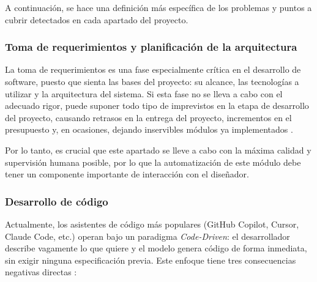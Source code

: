 \documentclass[11pt, letterpaper]{article}
\begin{document}
A continuación, se hace una definición más específica de los problemas y puntos a cubrir detectados en cada apartado del proyecto.
\newpage 

\subsubsection{Toma de requerimientos y planificación de la arquitectura}
\label{sec:ProblemaTomaRequerimientos}

La toma de requerimientos es una fase especialmente crítica en el desarrollo de software, puesto que sienta las bases del proyecto: su alcance, las tecnologías a utilizar y la arquitectura del sistema. Si esta fase no se lleva a cabo con el adecuado rigor, puede suponer todo tipo de imprevistos en la etapa de desarrollo del proyecto, causando retrasos en la entrega del proyecto, incrementos en el presupuesto y, en ocasiones, dejando inservibles módulos ya implementados \cite{standish_chaos_1994}.

Por lo tanto, es crucial que este apartado se lleve a cabo con la máxima calidad y supervisión humana posible, por lo que la automatización de este módulo debe tener un componente importante de interacción con el diseñador.

\subsubsection{Desarrollo de código}
\label{sec:ProblemaDesarrolloCodigo}

Actualmente, los asistentes de código más populares (GitHub Copilot, Cursor, Claude Code, etc.) operan bajo un paradigma \textit{Code-Driven}: el desarrollador describe vagamente lo que quiere y el modelo genera código de forma inmediata, sin exigir ninguna especificación previa. Este enfoque tiene tres consecuencias negativas directas \cite{vaithilingam_2022}:
\end{document}
